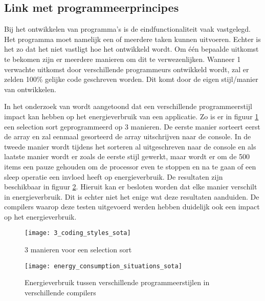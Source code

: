 \subsection{Link met programmeerprincipes}
Bij het ontwikkelen van programma's is de eindfunctionaliteit vaak vastgelegd. Het programma moet namelijk een of meerdere taken kunnen uitvoeren. Echter is het zo dat het niet vastligt hoe het ontwikkeld wordt. Om één bepaalde uitkomst te bekomen zijn er meerdere manieren om dit te verwezenlijken. Wanneer 1 verwachte uitkomst door verschillende programmeurs ontwikkeld wordt, zal er zelden 100\% gelijke code geschreven worden. Dit komt door de eigen stijl/manier van ontwikkelen.

\bigskip

In het onderzoek van \textcite{Hassan2017} wordt aangetoond dat een verschillende programmeerstijl impact kan hebben op het energieverbruik van een applicatie. Zo is er in figuur \ref{3_coding_styles_sota} een selection sort geprogrammeerd op 3 manieren. De eerste manier sorteert eerst de array en zal eenmaal gesorteerd de array uitschrijven naar de console. In de tweede manier wordt tijdens het sorteren al uitgeschreven naar de console en als laatste manier wordt er zoals de eerste stijl gewerkt, maar wordt er om de 500 items een pauze gehouden om de processor even te stoppen en na te gaan of een sleep operatie een invloed heeft op energieverbruik. De resultaten zijn beschikbaar in figuur \ref{energy_consumption_situations_sota}. Hieruit kan er besloten worden dat elke manier verschilt in energieverbruik. Dit is echter niet het enige wat deze resultaten aanduiden. De compilers waarop deze testen uitgevoerd werden hebben duidelijk ook een impact op het energieverbruik.\\

\bigskip

\begin{figure}[H]
    \texttt{[image: 3\_coding\_styles\_sota]}
    \centering
    \caption{3 manieren voor een selection sort \autocite{Hassan2017}}
    \label{3_coding_styles_sota}
\end{figure}

\begin{figure}[H]
    \texttt{[image: energy\_consumption\_situations\_sota]}
    \centering
    \caption[Energieverbruik tussen programmeerstijlen]{Energieverbruik tussen verschillende programmeerstijlen in verschillende compilers \autocite{Hassan2017}}
    \label{energy_consumption_situations_sota}
\end{figure}



